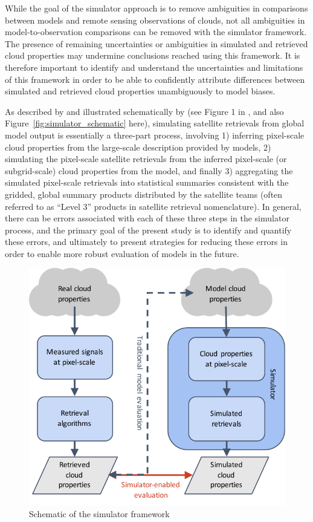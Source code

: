 While the goal of the simulator approach is to remove ambiguities in
comparisons between models and remote sensing observations of clouds,
not all ambiguities in model-to-observation comparisons can be removed
with the simulator framework. The presence of remaining uncertainties or
ambiguities in simulated and retrieved cloud properties may undermine
conclusions reached using this framework. It is therefore important to
identify and understand the uncertainties and limitations of this
framework in order to be able to confidently attribute differences
between simulated and retrieved cloud properties unambiguously to model
biases.

As described by \citet{pincus_et_al_2012} and illustrated schematically
by \citet{bodas-salcedo_et_al_2011} (see Figure 1 in
\citet{bodas-salcedo_et_al_2011}, and also
Figure~\ref{fig:simulator_schematic} here), simulating satellite
retrievals from global model output is essentially a three-part process,
involving 1) inferring pixel-scale cloud properties from the large-scale
description provided by models, 2) simulating the pixel-scale satellite
retrievals from the inferred pixel-scale (or subgrid-scale) cloud
properties from the model, and finally 3) aggregating the simulated
pixel-scale retrievals into statistical summaries consistent with the
gridded, global summary products distributed by the satellite teams
(often referred to as ``Level 3'' products in satellite retrieval
nomenclature). In general, there can be errors associated with each of
these three steps in the simulator process, and the primary goal of the
present study is to identify and quantify these errors, and ultimately
to present strategies for reducing these errors in order to enable more
robust evaluation of models in the future.

\begin{figure}[htbp]
\centering
\includegraphics{graphics/simulator_schematic.pdf}
\caption{\label{fig:simulator_schematic}Schematic of the simulator
framework}\label{fig:simulatorux5fschematic}
\end{figure}

